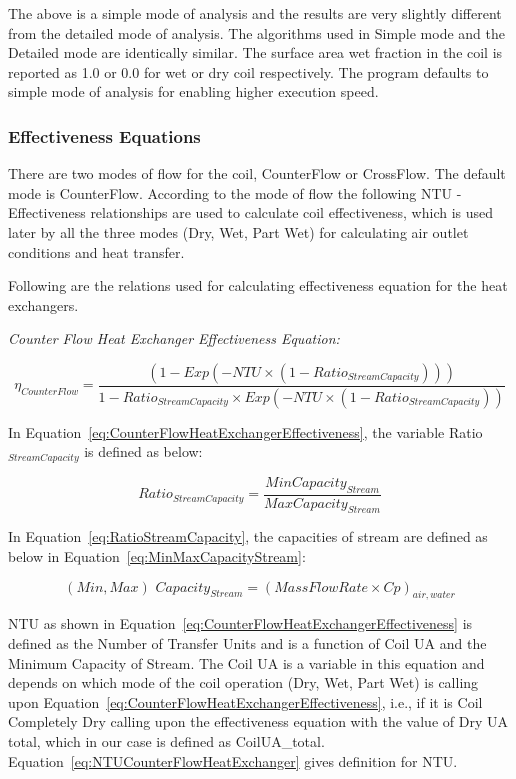 The above is a simple mode of analysis and the results are very slightly different from the detailed mode of analysis. The algorithms used in Simple mode and the Detailed mode are identically similar. The surface area wet fraction in the coil is reported as 1.0 or 0.0 for wet or dry coil respectively. The program defaults to simple mode of analysis for enabling higher execution speed.

\subsubsection{Effectiveness Equations}\label{effectiveness-equations}

There are two modes of flow for the coil, CounterFlow or CrossFlow. The default mode is CounterFlow. According to the mode of flow the following NTU - Effectiveness relationships are used to calculate coil effectiveness, which is used later by all the three modes (Dry, Wet, Part Wet) for calculating air outlet conditions and heat transfer.

Following are the relations used for calculating effectiveness equation for the heat exchangers.

\emph{Counter Flow Heat Exchanger Effectiveness Equation:}

\begin{equation}
{\eta_{CounterFlow}} = \frac{{(1 - Exp( - NTU \times (1 - Rati{o_{StreamCapacity}})))}}{{1 - Rati{o_{StreamCapacity}} \times Exp( - NTU \times (1 - Rati{o_{StreamCapacity}}))}}
\label{eq:CounterFlowHeatExchangerEffectiveness}
\end{equation}

In Equation~\ref{eq:CounterFlowHeatExchangerEffectiveness}, the variable Ratio\(_{StreamCapacity}\) is defined as below:

\begin{equation}
Rati{o_{StreamCapacity}} = \frac{{MinCapacit{y_{Stream}}}}{{MaxCapacit{y_{Stream}}}}
\label{eq:RatioStreamCapacity}
\end{equation}

In Equation~\ref{eq:RatioStreamCapacity}, the capacities of stream are defined as below in Equation~\ref{eq:MinMaxCapacityStream}:

\begin{equation}
(Min,Max)\,\,Capacit{y_{Stream}} = {(MassFlowRate \times Cp)_{air,water}}
\label{eq:MinMaxCapacityStream}
\end{equation}

NTU as shown in Equation~\ref{eq:CounterFlowHeatExchangerEffectiveness} is defined as the Number of Transfer Units and is a function of Coil UA and the Minimum Capacity of Stream. The Coil UA is a variable in this equation and depends on which mode of the coil operation (Dry, Wet, Part Wet) is calling upon Equation~\ref{eq:CounterFlowHeatExchangerEffectiveness}, i.e., if it is Coil Completely Dry calling upon the effectiveness equation with the value of Dry UA total, which in our case is defined as CoilUA\_total. Equation~\ref{eq:NTUCounterFlowHeatExchanger} gives definition for NTU.

